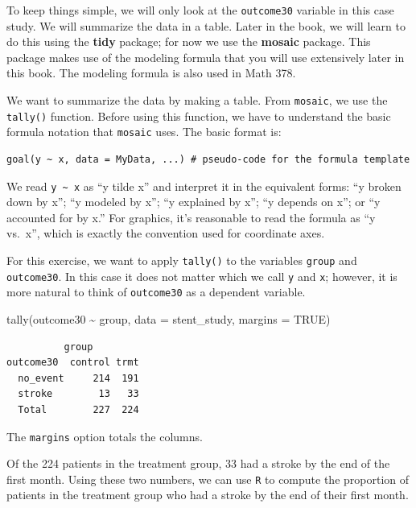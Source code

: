 \documentclass[
  letterpaper,
  DIV=11,
  numbers=noendperiod]{scrreprt}
\newenvironment{Shaded}{\begin{snugshade}}{\end{snugshade}}
\newcommand{\AttributeTok}[1]{\textcolor[rgb]{0.40,0.45,0.13}{#1}}
\newcommand{\ConstantTok}[1]{\textcolor[rgb]{0.56,0.35,0.01}{#1}}
\newcommand{\FunctionTok}[1]{\textcolor[rgb]{0.28,0.35,0.67}{#1}}
\newcommand{\NormalTok}[1]{\textcolor[rgb]{0.00,0.23,0.31}{#1}}
\newcommand{\SpecialCharTok}[1]{\textcolor[rgb]{0.37,0.37,0.37}{#1}}
\begin{document}
To keep things simple, we will only look at the \texttt{outcome30}
variable in this case study. We will summarize the data in a table.
Later in the book, we will learn to do this using the \textbf{tidy}
package; for now we use the \textbf{mosaic} package. This package makes
use of the modeling formula that you will use extensively later in this
book. The modeling formula is also used in Math 378.

We want to summarize the data by making a table. From \texttt{mosaic},
we use the \texttt{tally()} function. Before using this function, we
have to understand the basic formula notation that \texttt{mosaic} uses.
The basic format is:

\begin{verbatim}
goal(y ~ x, data = MyData, ...) # pseudo-code for the formula template
\end{verbatim}

We read \texttt{y\ \textasciitilde{}\ x} as ``y tilde x'' and interpret
it in the equivalent forms: ``y broken down by x''; ``y modeled by x'';
``y explained by x''; ``y depends on x''; or ``y accounted for by x.''
For graphics, it's reasonable to read the formula as ``y vs.~x'', which
is exactly the convention used for coordinate axes.

For this exercise, we want to apply \texttt{tally()} to the variables
\texttt{group} and \texttt{outcome30}. In this case it does not matter
which we call \texttt{y} and \texttt{x}; however, it is more natural to
think of \texttt{outcome30} as a dependent variable.

\begin{Shaded}
\begin{Highlighting}[]
\FunctionTok{tally}\NormalTok{(outcome30 }\SpecialCharTok{\textasciitilde{}}\NormalTok{ group, }\AttributeTok{data =}\NormalTok{ stent\_study, }\AttributeTok{margins =} \ConstantTok{TRUE}\NormalTok{)}
\end{Highlighting}
\end{Shaded}

\begin{verbatim}
          group
outcome30  control trmt
  no_event     214  191
  stroke        13   33
  Total        227  224
\end{verbatim}

The \texttt{margins} option totals the columns.

Of the 224 patients in the treatment group, 33 had a stroke by the end
of the first month. Using these two numbers, we can use \texttt{R} to
compute the proportion of patients in the treatment group who had a
stroke by the end of their first month.
\end{document}
